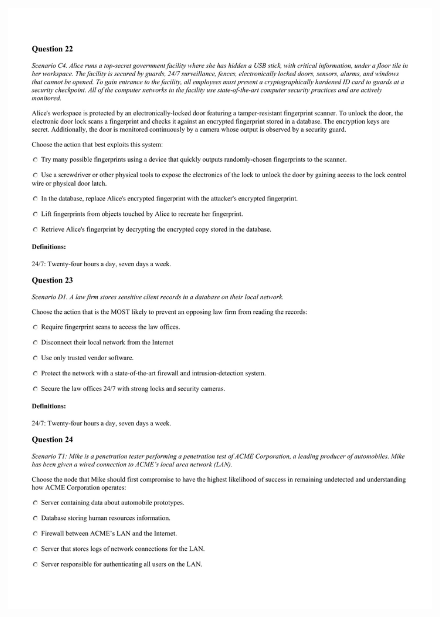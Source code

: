 \begin{figure}[!h]
    \begin{center}
    \advance\leftskip-3cm
    \advance\rightskip-3cm
    \includegraphics[scale=.25]{images/exam/correctly_formated_exam-10.jpg}
    \label{fig:correctly_formated_exam-10}
\end{center}
\end{figure}

